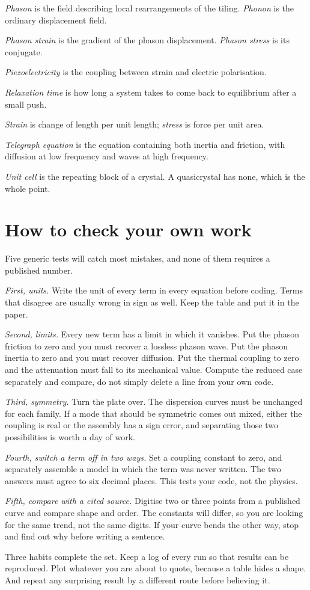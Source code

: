 \documentclass[11pt]{article}
\begin{document}
\textit{Phason} is the field describing local rearrangements of the tiling. \textit{Phonon} is the ordinary
displacement field.

\textit{Phason strain} is the gradient of the phason displacement. \textit{Phason stress} is its conjugate.

\textit{Piezoelectricity} is the coupling between strain and electric polarisation.

\textit{Relaxation time} is how long a system takes to come back to equilibrium after a small push.

\textit{Strain} is change of length per unit length; \textit{stress} is force per unit area.

\textit{Telegraph equation} is the equation containing both inertia and friction, with diffusion at low
frequency and waves at high frequency.

\textit{Unit cell} is the repeating block of a crystal. A quasicrystal has none, which is the whole point.

\section{How to check your own work}

Five generic tests will catch most mistakes, and none of them requires a published number.

\textit{First, units.} Write the unit of every term in every equation before coding. Terms that disagree are
usually wrong in sign as well. Keep the table and put it in the paper.

\textit{Second, limits.} Every new term has a limit in which it vanishes. Put the phason friction to zero and
you must recover a lossless phason wave. Put the phason inertia to zero and you must recover diffusion. Put
the thermal coupling to zero and the attenuation must fall to its mechanical value. Compute the reduced case
separately and compare, do not simply delete a line from your own code.

\textit{Third, symmetry.} Turn the plate over. The dispersion curves must be unchanged for each family. If a
mode that should be symmetric comes out mixed, either the coupling is real or the assembly has a sign error,
and separating those two possibilities is worth a day of work.

\textit{Fourth, switch a term off in two ways.} Set a coupling constant to zero, and separately assemble a
model in which the term was never written. The two answers must agree to six decimal places. This tests your
code, not the physics.

\textit{Fifth, compare with a cited source.} Digitise two or three points from a published curve and compare
shape and order. The constants will differ, so you are looking for the same trend, not the same digits. If
your curve bends the other way, stop and find out why before writing a sentence.

Three habits complete the set. Keep a log of every run so that results can be reproduced. Plot whatever you
are about to quote, because a table hides a shape. And repeat any surprising result by a different route
before believing it.
\end{document}
